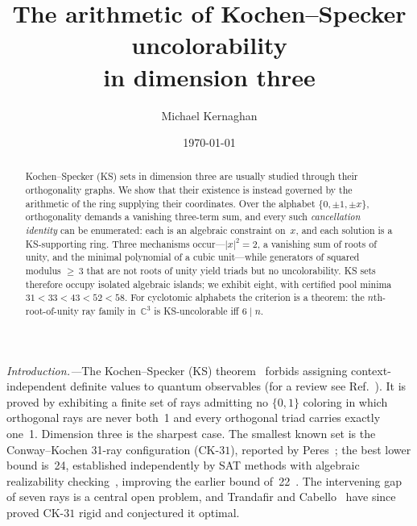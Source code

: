 \documentclass[twocolumn,prl,superscriptaddress,nofootinbib]{revtex4-2}
\newcommand{\C}{\mathbb{C}}
\newcommand{\CK}{\mathrm{CK}\text{-}31}
\begin{document}
\title{The arithmetic of Kochen--Specker uncolorability\\in dimension three}

\author{Michael Kernaghan}

\date{\today}

\begin{abstract}
Kochen--Specker (KS) sets in dimension three are usually studied through their
orthogonality graphs.  We show that their existence is instead governed by the
arithmetic of the ring supplying their coordinates.  Over the alphabet
$\{0,\pm1,\pm x\}$, orthogonality demands a vanishing three-term sum, and every
such \emph{cancellation identity} can be enumerated: each is an algebraic
constraint on~$x$, and each solution is a KS-supporting ring.  Three mechanisms
occur---$|x|^2=2$, a vanishing sum of roots of unity, and the minimal polynomial
of a cubic unit---while generators of squared modulus ${\geq}\,3$ that are not
roots of unity yield triads but no uncolorability.  KS sets therefore occupy
isolated algebraic islands; we exhibit eight, with certified pool minima
$31 < 33 < 43 < 52 < 58$.  For cyclotomic alphabets the criterion is a theorem:
the $n$th-root-of-unity ray family in~$\C^3$ is KS-uncolorable iff $6 \mid n$.
\end{abstract}

\maketitle

\textit{Introduction.---}The Kochen--Specker (KS) theorem~\cite{KochenSpecker1967}
forbids assigning context-independent definite values to quantum observables (for
a review see Ref.~\cite{Budroni2022}).  It is proved by exhibiting a finite set of
rays admitting no $\{0,1\}$ coloring in which orthogonal rays are never both~1 and
every orthogonal triad carries exactly one~1.  Dimension three is the sharpest
case.  The smallest known set is the Conway--Kochen 31-ray configuration
($\CK$), reported by Peres~\cite{Peres1993}; the best lower bound is~24,
established independently by SAT methods with algebraic realizability
checking~\cite{LiBrightGanesh2024,KirchwegarPeitlSzeider2023}, improving the
earlier bound of~22~\cite{UijlenWesterbaan2016}.  The intervening gap of seven
rays is a central open problem, and Trandafir and Cabello~\cite{TrandafirCabello2025}
have since proved $\CK$ rigid and conjectured it optimal.
\end{document}
